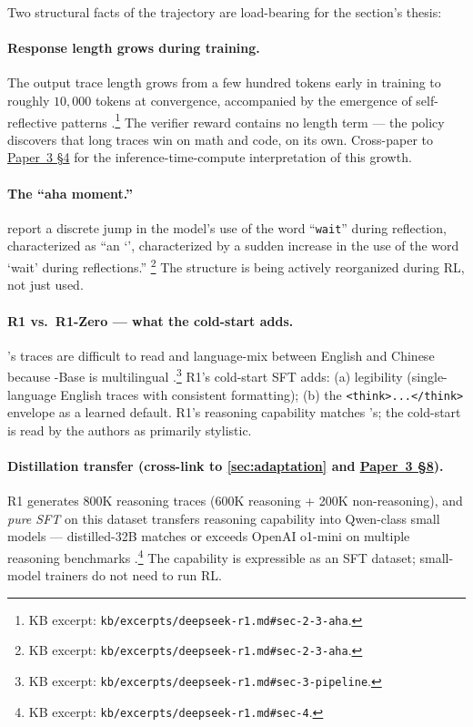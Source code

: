 Two structural facts of the trajectory are load-bearing for the
section's thesis:

\paragraph{Response length grows during training.} The output trace
length grows from a few hundred tokens early in training to roughly
$10{,}000$ tokens at convergence, accompanied by the emergence of
self-reflective patterns
\citep[\S 2.3]{deepseek-r1}.\footnote{KB excerpt:
\texttt{kb/excerpts/deepseek-r1.md\#sec-2-3-aha}.} The verifier reward
contains no length term — the policy discovers that long traces win on
math and code, on its own. Cross-paper to \hyperref[P3-sec:inference-compute-scaling]{Paper~3 §4} for the
inference-time-compute interpretation of this growth.

\paragraph{The ``aha moment.''} \citet[\S 2.3]{deepseek-r1} report a
discrete jump in the model's use of the word ``\texttt{wait}'' during
reflection, characterized as ``an `', characterized by a
sudden increase in the use of the word `wait' during reflections.''
\footnote{KB excerpt:
\texttt{kb/excerpts/deepseek-r1.md\#sec-2-3-aha}.} The 
structure is being actively reorganized during RL, not just used.

\paragraph{R1 vs.\ R1-Zero — what the cold-start adds.} 's traces
are difficult to read and language-mix between English and Chinese
because -Base is multilingual
\citep[\S 3]{deepseek-r1}.\footnote{KB excerpt:
\texttt{kb/excerpts/deepseek-r1.md\#sec-3-pipeline}.} R1's cold-start
SFT adds: (a) legibility (single-language English traces with consistent
formatting); (b) the \texttt{<think>...</think>} envelope as a learned
default. R1's reasoning capability matches 's; the cold-start is
read by the authors as primarily stylistic.

\paragraph{Distillation transfer (cross-link to \cref{sec:adaptation}
and \hyperref[P3-sec:r1-family]{Paper~3 §8}).} R1 generates $800$K reasoning traces (600K reasoning
+ 200K non-reasoning), and \emph{pure SFT} on this dataset transfers
reasoning capability into Qwen-class small models — distilled-32B
matches or exceeds OpenAI o1-mini on multiple reasoning benchmarks
\citep[\S 4]{deepseek-r1}.\footnote{KB excerpt:
\texttt{kb/excerpts/deepseek-r1.md\#sec-4}.} The capability is
expressible as an SFT dataset; small-model trainers do not need to run
RL.

